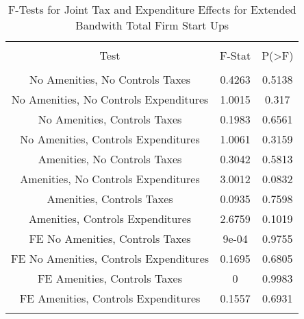 
\begin{table}[!htbp] \centering 
  \caption{F-Tests for Joint Tax and Expenditure Effects for Extended Bandwith Total Firm Start Ups} 
  \label{--Ftests} 
\begin{tabular}{@{\extracolsep{5pt}} ccc} 
\\[-1.8ex]\hline 
\hline \\[-1.8ex] 
Test & F-Stat & P(\textgreater F) \\ 
\hline \\[-1.8ex] 
No Amenities, No Controls Taxes & 0.4263 & 0.5138 \\ 
No Amenities, No Controls Expenditures & 1.0015 & 0.317 \\ 
No Amenities, Controls Taxes & 0.1983 & 0.6561 \\ 
No Amenities, Controls Expenditures & 1.0061 & 0.3159 \\ 
Amenities, No Controls Taxes & 0.3042 & 0.5813 \\ 
Amenities, No Controls Expenditures & 3.0012 & 0.0832 \\ 
Amenities, Controls Taxes & 0.0935 & 0.7598 \\ 
Amenities, Controls Expenditures & 2.6759 & 0.1019 \\ 
FE No Amenities, Controls Taxes & 9e-04 & 0.9755 \\ 
FE No Amenities, Controls Expenditures & 0.1695 & 0.6805 \\ 
FE Amenities, Controls Taxes & 0 & 0.9983 \\ 
FE Amenities, Controls Expenditures & 0.1557 & 0.6931 \\ 
\hline \\[-1.8ex] 
\end{tabular} 
\end{table} 
